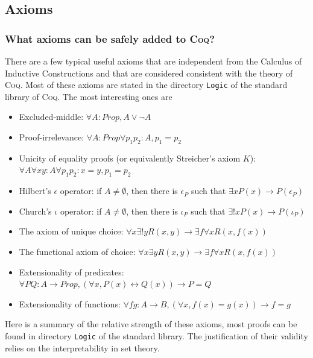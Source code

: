 \documentclass[a4paper,pdftex]{article}
\def\Question#1{\stepcounter{question}\subsubsection{#1}}
\def\Coq{\textsc{Coq}}
\begin{document}
\subsection{Axioms}

\Question{What axioms can be safely added to {\Coq}?}

There are a few typical useful axioms that are independent from the
Calculus of Inductive Constructions and that are considered consistent with
the theory of {\Coq}.
Most of these axioms are stated in the directory {\tt Logic} of the
standard library of {\Coq}. The most interesting ones are

\begin{itemize}
\item Excluded-middle: $\forall A:Prop, A \vee \neg A$
\item Proof-irrelevance: $\forall A:Prop \forall p_1 p_2:A, p_1=p_2$
\item Unicity of equality proofs (or equivalently Streicher's axiom $K$):
$\forall A \forall x y:A \forall p_1 p_2:x=y, p_1=p_2$
\item Hilbert's $\epsilon$ operator: if $A \neq \emptyset$, then there is $\epsilon_P$ such that $\exists x P(x) \rightarrow P(\epsilon_P)$
\item Church's $\iota$ operator: if $A \neq \emptyset$, then there is $\iota_P$ such that $\exists! x P(x) \rightarrow P(\iota_P)$
\item The axiom of unique choice: $\forall x \exists! y R(x,y) \rightarrow \exists f \forall x R(x,f(x))$
\item The functional axiom of choice: $\forall x \exists y R(x,y) \rightarrow \exists f \forall x R(x,f(x))$
\item Extensionality of predicates: $\forall P Q:A\rightarrow Prop, (\forall x, P(x) \leftrightarrow Q(x)) \rightarrow P=Q$
\item Extensionality of functions: $\forall f g:A\rightarrow B, (\forall x, f(x)=g(x)) \rightarrow f=g$
\end{itemize}

Here is a summary of the relative strength of these axioms, most
proofs can be found in directory {\tt Logic} of the standard library.
The justification of their validity relies on the interpretability in
set theory.
\end{document}
